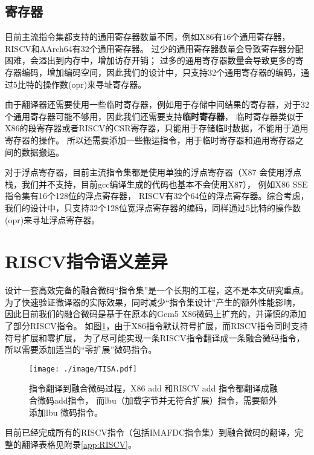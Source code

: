 \subsection{寄存器}

目前主流指令集都支持的通用寄存器数量不同，例如X86有16个通用寄存器，RISCV和AArch64有32个通用寄存器。
过少的通用寄存器数量会导致寄存器分配困难，会溢出到内存中，增加访存开销；
过多的通用寄存器数量会导致更多的寄存器编码，增加编码空间，因此我们的设计中，只支持32个通用寄存器的编码，通过5比特的操作数(opr)来寻址寄存器。

由于翻译器还需要使用一些临时寄存器，例如用于存储中间结果的寄存器，对于32个通用寄存器可能不够用，因此我们还需要支持\textbf{临时寄存器}，
临时寄存器类似于X86的段寄存器或者RISCV的CSR寄存器，只能用于存储临时数据，不能用于通用寄存器的操作。
所以还需要添加一些搬运指令，用于临时寄存器和通用寄存器之间的数据搬运。

对于浮点寄存器，目前主流指令集都是使用单独的浮点寄存器（X87 会使用浮点栈，我们并不支持，目前gcc编译生成的代码也基本不会使用X87），
例如X86 SSE指令集有16个128位的浮点寄存器，
RISCV有32个64位的浮点寄存器。综合考虑，我们的设计中，只支持32个128位宽浮点寄存器的编码，同样通过5比特的操作数(opr)来寻址浮点寄存器。





\section{RISCV指令语义差异}

设计一套高效完备的融合微码“指令集”是一个长期的工程，这不是本文研究重点。
为了快速验证微译器的实际效果，同时减少“指令集设计”产生的额外性能影响，
因此目前我们的融合微码是基于在原本的Gem5 X86微码上扩充的，并谨慎的添加了部分RISCV指令。
如图\ref{img:TISA}，由于X86指令默认符号扩展，而RISCV指令同时支持符号扩展和零扩展，
为了尽可能实现一条RISCV指令翻译成一条融合微码指令，所以需要添加适当的“零扩展”微码指令。

\begin{figure}[!htbp]
  \centering
  \texttt{[image: ./image/TISA.pdf]}
  \caption{指令翻译到融合微码过程，X86 add 和RISCV add 指令都翻译成融合微码add指令，
  而lbu（加载字节并无符合扩展）指令，需要额外添加lbu 微码指令。}
  \label{img:TISA}
\end{figure}



目前已经完成所有的RISCV指令（包括IMAFDC指令集）到融合微码的翻译，完整的翻译表格见附录\ref{app:RISCV}。

